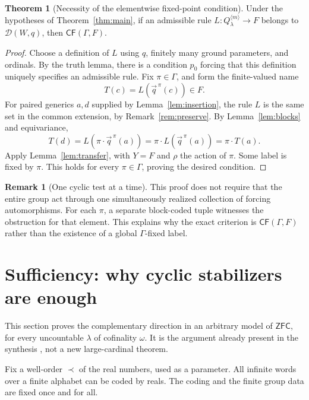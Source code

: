 \documentclass[11pt,letterpaper]{article}
\theoremstyle{definition}
\newtheorem{theorem}[definition]{Theorem}
\newtheorem{remark}[definition]{Remark}
\numberwithin{equation}{section}
\newcommand{\ZFC}{\mathsf{ZFC}}
\newcommand{\CF}{\mathsf{CF}}
\newcommand{\DD}{\mathscr D}
\begin{document}
\begin{theorem}[Necessity of the elementwise fixed-point condition]\label{thm:necessity}
Under the hypotheses of Theorem~\ref{thm:main}, if an admissible rule $L:Q_\lambda^{\langle m\rangle}\to F$ belongs to $\DD(W,q)$, then $\CF(\Gamma,F)$.
\end{theorem}
\begin{proof}
Choose a definition of $L$ using $q$, finitely many ground parameters, and ordinals. By the truth lemma, there is a condition $p_0$ forcing that this definition uniquely specifies an admissible rule. Fix $\pi\in\Gamma$, and form the finite-valued name
\[
 T(c)=L(\vec q^{\,\pi}(c))\in F.
\]
For paired generics $a,d$ supplied by Lemma~\ref{lem:insertion}, the rule $L$ is the same set in the common extension, by Remark~\ref{rem:preserve}. By Lemma~\ref{lem:blocks} and equivariance,
\[
 T(d)=L(\pi\cdot\vec q^{\,\pi}(a))
      =\pi\cdot L(\vec q^{\,\pi}(a))=\pi\cdot T(a).
\]
Apply Lemma~\ref{lem:transfer}, with $Y=F$ and $\rho$ the action of $\pi$. Some label is fixed by $\pi$. This holds for every $\pi\in\Gamma$, proving the desired condition.
\end{proof}

\begin{remark}[One cyclic test at a time]
This proof does not require that the entire group act through one simultaneously realized collection of forcing automorphisms. For each $\pi$, a separate block-coded tuple witnesses the obstruction for that element. This explains why the exact criterion is $\CF(\Gamma,F)$ rather than the existence of a global $\Gamma$-fixed label.
\end{remark}

\section{Sufficiency: why cyclic stabilizers are enough}\label{sec:sufficiency}

This section proves the complementary direction in an arbitrary model of $\ZFC$, for every uncountable $\lambda$ of cofinality $\omega$. It is the argument already present in the synthesis \cite[section ``The exact finite-label classification'']{synthesis}, not a new large-cardinal theorem.

Fix a well-order $\prec$ of the real numbers, used as a parameter. All infinite words over a finite alphabet can be coded by reals. The coding and the finite group data are fixed once and for all.
\end{document}
